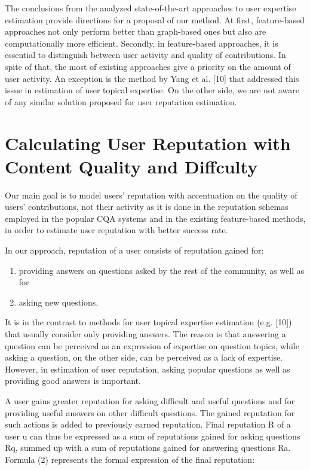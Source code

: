\documentclass{llncs}
\begin{document}
			The conclusions from the analyzed state-of-the-art approaches to user expertise
			estimation provide directions for a proposal of our method. At first,
			feature-based approaches not only perform better than graph-based ones but
			also are computationally more efficient. Secondly, in feature-based approaches,
			it is essential to distinguish between user activity and quality of contributions.
			In spite of that, the most of existing approaches give a priority on the amount
			of user activity. An exception is the method by Yang et al. [10] that addressed
			this issue in estimation of user topical expertise. On the other side, we are not
			aware of any similar solution proposed for user reputation estimation.

	
	\section{Calculating User Reputation with Content Quality and	Diffculty}
			Our main goal is to model users’ reputation with accentuation on the quality of
			users’ contributions, not their activity as it is done in the reputation schemas employed
			in the popular CQA systems and in the existing feature-based methods,
			in order to estimate user reputation with better success rate.
			
			In our approach, reputation of a user consists of reputation gained for:
	
		\begin{enumerate}
			\item  providing answers on questions asked by the rest of the community, as well 
					as for
			\item  asking new questions.
		\end{enumerate}
		
			It is in the contrast to methods for user topical expertise estimation (e.g.
			[10]) that usually consider only providing answers. The reason is that answering
			a question can be perceived as an expression of expertise on question topics,
			while asking a question, on the other side, can be perceived as a lack of expertise.
			However, in estimation of user reputation, asking popular questions as well as
			providing good answers is important.
			
			A user gains greater reputation for asking difficult and useful questions and
			for providing useful answers on other difficult questions. The gained reputation
			for such actions is added to previously earned reputation. Final reputation R of a
			user u can thus be expressed as a sum of reputations gained for asking questions
			Rq, summed up with a sum of reputations gained for answering questions Ra.
			Formula (2) represents the formal expression of the final reputation:
			
\end{document}
